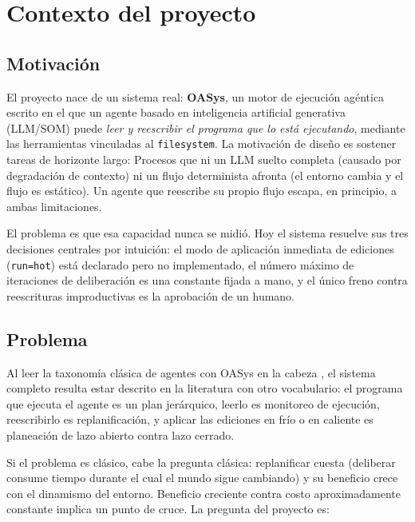 \section{Contexto del proyecto}

\subsection*{Motivación}

El proyecto nace de un sistema real: \textbf{OASys}, un motor de ejecución agéntica escrito en el que un agente basado en inteligencia artificial generativa (LLM/SOM) puede \emph{leer y reescribir el programa que lo está ejecutando}, mediante las herramientas vinculadas al \texttt{filesystem}. La motivación de diseño es sostener tareas de horizonte largo: Procesos que ni un LLM suelto completa (causado por degradación de contexto) ni un flujo determinista afronta (el entorno cambia y el flujo es estático). Un agente que reescribe su propio flujo escapa, en principio, a ambas limitaciones.


El problema es que esa capacidad nunca se midió. Hoy el sistema resuelve sus tres decisiones centrales por intuición: el modo de aplicación inmediata de ediciones (\texttt{run=hot}) está declarado pero no implementado, el número máximo de iteraciones de deliberación es una constante fijada a mano, y el único freno contra reescrituras improductivas es la aprobación de un humano.

\subsection*{Problema}

Al leer la taxonomía clásica de agentes con OASys en la cabeza \parencite{russellNorvig2020}, el sistema completo resulta estar descrito en la literatura con otro vocabulario: el programa que ejecuta el agente es un plan jerárquico, leerlo es monitoreo de ejecución, reescribirlo es replanificación, y aplicar las ediciones en frío o en caliente es planeación de lazo abierto contra lazo cerrado.

Si el problema es clásico, cabe la pregunta clásica: replanificar cuesta (deliberar consume tiempo durante el cual el mundo sigue cambiando) y su beneficio crece con el dinamismo del entorno. Beneficio creciente contra costo aproximadamente constante implica un punto de cruce. La pregunta del proyecto es:

